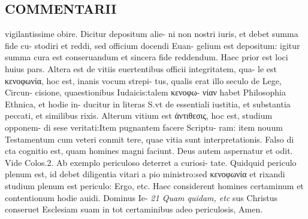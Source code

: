 \documentclass{article}
\begin{document}
\begin{pages}
\section*{COMMENTARII }
\marginpar{[ p.170 ]}\pstart vigilantissime obire. Dicitur depositum alie- ni non nostri iuris, et debet summa fide cu- stodiri et reddi, sed officium docendi Euan- gelium est depositum: igitur summa cura est conseruandum et sincera fide reddendum. Haec prior est loci huius pars. Altera est de vitiis euertentibus officii integritatem, qua- le est κενοφωνία, hoc est, inanis vocum strepi- tus, qualis erat illo seculo de Lege, Circun- cisione, quaestionibus Iudaicis:talem κενοφω- νίαν habet Philosophia Ethnica, et hodie in- ducitur in literas S.vt de essentiali iustitia, et substantia peccati, et similibus rixis. Alterum vitium est ἀντιθεσις, hoc est, studium opponem- di sese veritati:Item pugnantem facere Scriptu- ram: item nouum Testamentum cum veteri conmit tere, quae vitia sunt interpretationis. Falso di cta cognitio est, quam homines magni faciunt. Deus autem aspernatur et odit. Vide Colos.2. Ab exemplo periculoso deterret a curiosi- tate. Quidquid periculo plenum est, id debet diligentia vitari a pio ministro:sed κενοφωνία et rixandi studium plenum est periculo: Ergo, etc. Haec considerent homines certaminum et contentionum hodie auidi. Dominus Ie-  \pend
\textit{21 Quam quidam, etc }\pstart sus Christus conseruet Esclesiam suam in tot certaminibus adeo periculosis, Amen.  \pend
\end{pages}
\end{document}
